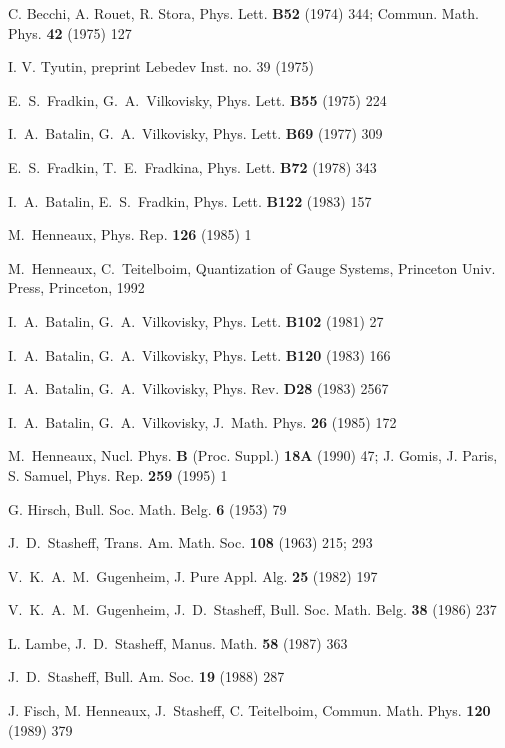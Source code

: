 \documentclass[a4paper,12pt]{article}
\begin{document}
\begin{thebibliography}{99}
  C. Becchi, A. Rouet, R. Stora, Phys. Lett. {\textbf{B52}}
(1974) 344; Commun. Math. Phys. \textbf{42} (1975) 127

  I. V. Tyutin, preprint Lebedev Inst. no. 39 (1975)

  E.\ S.\ Fradkin, G.\ A.\ Vilkovisky, Phys. Lett. {\textbf{B55}}
(1975) 224

  I.\ A.\ Batalin, G.\ A.\ Vilkovisky, Phys. Lett. {\textbf{B69}}
(1977) 309

  E.\ S.\ Fradkin, T.\ E.\ Fradkina, Phys. Lett. {\textbf{B72}}
(1978) 343

  I.\ A.\ Batalin, E.\ S.\ Fradkin, Phys. Lett. {\textbf{B122}}
(1983) 157

  M.\ Henneaux, Phys. Rep. {\textbf{126}} (1985) 1

  M.\ Henneaux, C.\ Teitelboim, Quantization of Gauge Systems,
Princeton Univ. Press, Princeton, 1992

  I.\ A.\ Batalin, G.\ A.\ Vilkovisky, Phys. Lett. {\textbf{B102}}
(1981) 27

  I.\ A.\ Batalin, G.\ A.\ Vilkovisky, Phys. Lett. {\textbf{B120}%
} (1983) 166

  I.\ A.\ Batalin, G.\ A.\ Vilkovisky, Phys. Rev. {\textbf{D28}}
(1983) 2567

  I.\ A.\ Batalin, G.\ A.\ Vilkovisky, J.\ Math. Phys. {\textbf{%
26}} (1985) 172

  M.\ Henneaux, Nucl. Phys. \textbf{B} (Proc. Suppl.) {\textbf{%
18A}} (1990) 47; J. Gomis, J. Paris, S. Samuel, Phys. Rep. \textbf{259}
(1995) 1

  G. Hirsch, Bull. Soc. Math. Belg. {\textbf{6}} (1953) 79

  J.\ D.\ Stasheff, Trans. Am. Math. Soc. {\textbf{108}} (1963)
215; 293

  V.\ K.\ A.\ M.\ Gugenheim, J. Pure Appl. Alg. {\textbf{25}}
(1982) 197

  V.\ K.\ A.\ M.\ Gugenheim, J.\ D.\ Stasheff, Bull. Soc. Math.
Belg. {\textbf{38}} (1986) 237

  L. Lambe, J.\ D.\ Stasheff, Manus. Math. {\textbf{58}} (1987)
363

  J.\ D.\ Stasheff, Bull. Am. Soc. {\textbf{19}} (1988) 287

  J. Fisch, M. Henneaux, J.\ Stasheff, C. Teitelboim, Commun.
Math. Phys. {\textbf{120}} (1989) 379


\end{thebibliography}
\end{document}
